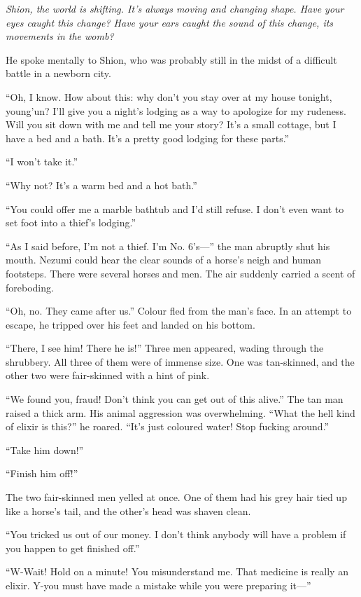 \emph{Shion, the world is shifting. It's always moving and changing shape.
Have your eyes caught this change? Have your ears caught the sound of
this change, its movements in the womb?}

He spoke mentally to Shion, who was probably still in the midst of a
difficult battle in a newborn city.

``Oh, I know. How about this: why don't you stay over at my house
tonight, young'un? I'll give you a night's lodging as a way to apologize
for my rudeness. Will you sit down with me and tell me your story? It's
a small cottage, but I have a bed and a bath. It's a pretty good lodging
for these parts.''

``I won't take it.''

``Why not? It's a warm bed and a hot bath.''

``You could offer me a marble bathtub and I'd still refuse. I don't even
want to set foot into a thief's lodging.''

``As I said before, I'm not a thief. I'm No. 6's---'' the man abruptly shut
his mouth. Nezumi could hear the clear sounds of a horse's neigh and
human footsteps. There were several horses and men. The air suddenly
carried a scent of foreboding.

``Oh, no. They came after us.'' Colour fled from the man's face. In an
attempt to escape, he tripped over his feet and landed on his bottom.

``There, I see him! There he is!'' Three men appeared, wading through
the shrubbery. All three of them were of immense size. One was
tan-skinned, and the other two were fair-skinned with a hint of pink.

``We found you, fraud! Don't think you can get out of this alive.'' The
tan man raised a thick arm. His animal aggression was overwhelming.
``What the hell kind of elixir is this?'' he roared. ``It's just
coloured water! Stop fucking around.''

``Take him down!''

``Finish him off!''

The two fair-skinned men yelled at once. One of them had his grey hair
tied up like a horse's tail, and the other's head was shaven clean.

``You tricked us out of our money. I don't think anybody will have a
problem if you happen to get finished off.''

``W-Wait! Hold on a minute! You misunderstand me. That medicine is
really an elixir. Y-you must have made a mistake while you were
preparing it---''

